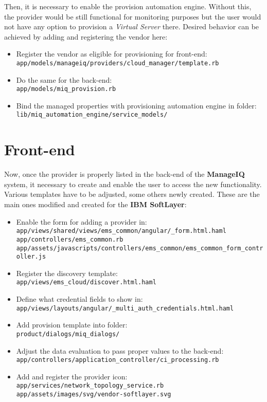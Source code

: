 Then, it is necessary to enable the provision automation engine. Without this, the provider would be still functional for monitoring purposes but the user would not have any option to provision a \emph{Virtual Server} there. Desired behavior can be achieved by adding and registering the vendor here:

\begin{itemize}
	\item Register the vendor as eligible for provisioning for front-end: \\
	\small{\verb|app/models/manageiq/providers/cloud_manager/template.rb|}
	\item Do the same for the back-end: \\
	\small{\verb|app/models/miq_provision.rb|}
	\item Bind the managed properties with provisioning automation engine in folder: \\
	\small{\verb|lib/miq_automation_engine/service_models/|}
\end{itemize}

\section{Front-end}
\label{sec:Front-end}

Now, once the provider is properly listed in the back-end of the \textbf{ManageIQ} system, it necessary to create and enable the user to access the new functionality. Various templates have to be adjusted, some others newly created. These are the main ones modified and created for the \textbf{IBM SoftLayer}:

\begin{itemize}
	\item Enable the form for adding a provider in:\\
	\small{\verb|app/views/shared/views/ems_common/angular/_form.html.haml| \\
		\verb|app/controllers/ems_common.rb| \\
		\verb|app/assets/javascripts/controllers/ems_common/ems_common_form_controller.js|}
	\item Register the discovery template: \\
	\small{\verb|app/views/ems_cloud/discover.html.haml|}
	\item Define what credential fields to show in: \\
	\small{\verb|app/views/layouts/angular/_multi_auth_credentials.html.haml|}
	\item Add provision template into folder: \\
	\small{\verb|product/dialogs/miq_dialogs/|}
	\item Adjust the data evaluation to pass proper values to the back-end: \\
	\small{\verb|app/controllers/application_controller/ci_processing.rb|}
	\item Add and register the provider icon: \\
	\small{\verb|app/services/network_topology_service.rb| \\
		\verb|app/assets/images/svg/vendor-softlayer.svg|}
\end{itemize}

